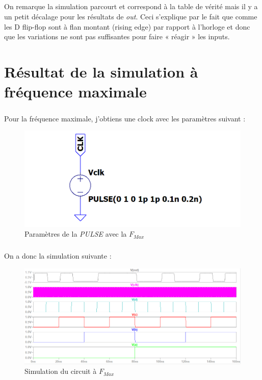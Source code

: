     \subparagraph{}On remarque la simulation parcourt et correspond à la table de vérité mais il y a un petit décalage pour les résultats de \textit{out}. Ceci s'explique par le fait que comme les D flip-flop sont à flan montant (rising edge) par rapport à l'horloge et donc que les variations ne sont pas suffisantes pour faire « réagir » les inputs.
    
    
\section{Résultat de la simulation à fréquence maximale}

    \subparagraph{}Pour la fréquence maximale, j'obtiens une clock avec les paramètres suivant :
    
        \begin{figure}[H]
            \centering
            \includegraphics[scale=0.5]{../pictures/Fmax.PNG}
            \caption{Paramètres de la \textit{PULSE} avec la $F_{Max}$}
        \end{figure}
        
        
    \subparagraph{}On a donc la simulation suivante :
    
    \begin{figure}[H]
        \centering
        \includegraphics[width=\textwidth]{../pictures/simu-Fmax.PNG}
        \caption{Simulation du circuit à $F_{Max}$}
    \end{figure}
        
